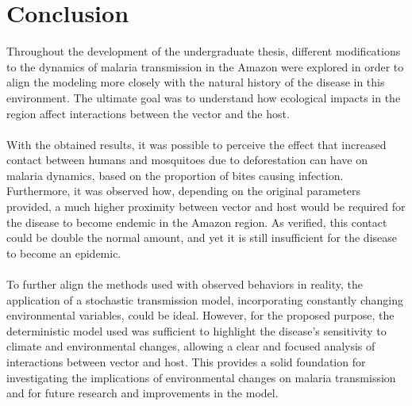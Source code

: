 \chapter{Conclusion}

Throughout the development of the undergraduate thesis, 
different modifications to the dynamics of malaria transmission in the Amazon were explored 
in order to align the modeling more closely with the natural history of the disease in this 
environment. The ultimate goal was to understand how ecological impacts in the 
region affect interactions between the vector and the host.
\\\\
With the obtained results, it was possible to 
perceive the effect that increased contact between humans and mosquitoes due 
to deforestation can have on malaria dynamics, based on the proportion of bites 
causing infection. Furthermore, it was observed how, depending on the original 
parameters provided, a much higher proximity between vector and host would be 
required for the disease to become endemic in the Amazon region. As verified, 
this contact could be double the normal amount, and yet it is still insufficient 
for the disease to become an epidemic.
\\\\
To further align the methods used with observed behaviors in reality, 
the application of a stochastic transmission model, incorporating constantly 
changing environmental variables, could be ideal. However, for the proposed 
purpose, the deterministic model used was sufficient to highlight the disease's 
sensitivity to climate and environmental changes, allowing a clear and focused 
analysis of interactions between vector and host. This provides a solid foundation 
for investigating the implications of environmental changes on malaria 
transmission and for future research and improvements in the model.
